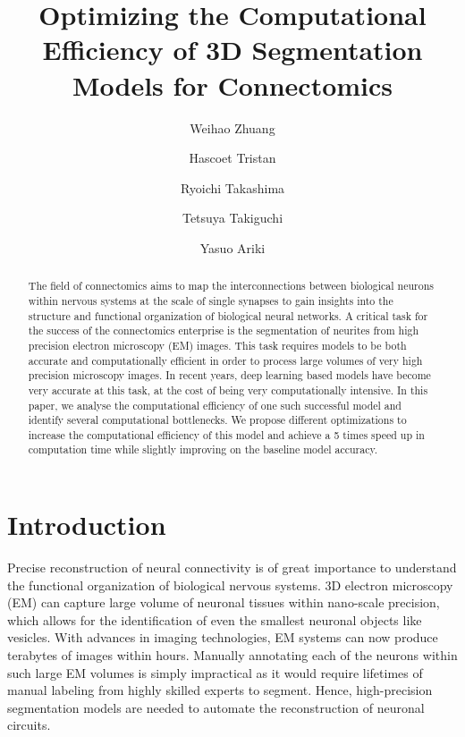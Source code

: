 \documentclass[runningheads]{llncs}
\begin{document}
\title{Optimizing the Computational Efficiency of 3D Segmentation Models for Connectomics}


\author{
Weihao Zhuang  %
\and
Hascoet Tristan %
\and
Ryoichi Takashima  %
\and
Tetsuya Takiguchi  %
\and
Yasuo Ariki %
}


\maketitle            

\begin{abstract}
The field of connectomics aims to map the interconnections between biological neurons within nervous systems at the scale of single synapses to gain insights into the structure and functional organization of biological neural networks. 
A critical task for the success of the connectomics enterprise is the segmentation of neurites from high precision electron microscopy (EM) images. 
This task requires models to be both accurate and computationally efficient in order to process large volumes of very high precision microscopy images. 
In recent years, deep learning based models have become very accurate at this task, at the cost of being very computationally intensive.
In this paper, we analyse the computational efficiency of one such successful model and identify several computational bottlenecks. 
We propose different optimizations to increase the computational efficiency of this model 
and achieve a 5 times speed up in computation time while slightly improving on the baseline model accuracy.

\end{abstract}

\section{Introduction}
Precise reconstruction of neural connectivity is of great importance to understand the functional organization of biological nervous systems. 
3D electron microscopy (EM) can capture large volume of neuronal tissues within nano-scale precision, which allows for the identification of even the smallest neuronal objects like vesicles. 
With advances in imaging technologies, EM systems can now produce terabytes of images within hours. 
Manually annotating each of the neurons within such large EM volumes is simply impractical as it would require lifetimes of manual labeling from highly skilled experts to segment. 
Hence, high-precision segmentation models are needed to automate the reconstruction of neuronal circuits. 
\end{document}
